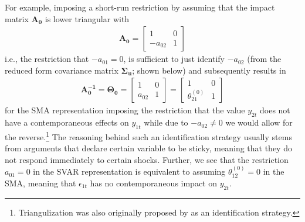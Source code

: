 \documentclass[a4paper,11pt,listof=nochaptergap,oneside,pointednumbers,bibtotoc,bigheadings,liststotoc,hidelinks]{scrbook}
\theoremstyle{mysatz}
\theoremstyle{mydefinition}
\theoremstyle{mytheorem}
\theoremstyle{mybemerkung}
\newcommand{\vect}[1]{\boldsymbol{\mathbf{#1}}}
\begin{document}
For example, imposing a short-run restriction by assuming that the impact matrix $\vect{A_0}$ is lower triangular with
\begin{equation} \label{eq:svar11}
\begin{split}
 		\vect{A_0} = 	\begin{bmatrix}
    					1 & 0 \\
					-a_{02} & 1
 					\end{bmatrix}
\end{split}								
\end{equation}
i.e., the restriction that $-a_{01}=0$, is sufficient to just identify $-a_{02}$ (from the reduced form covariance matrix $\vect{\Sigma_u}$; shown below) and subsequently results in 
\begin{equation} \label{eq:svar12}
\begin{split}
 		\vect{A_0^{-1}} = \vect{\Theta_0} = 	
					\begin{bmatrix}
    					1 & 0 \\
					a_{02} & 1
 					\end{bmatrix} = 
						\begin{bmatrix}
    						1 & 0 \\
						\theta_{21}^{(0)} & 1
 						\end{bmatrix}
\end{split}								
\end{equation}
for the SMA representation imposing the restriction that the value $y_{2t}$ does not have a contemporaneous effects on $y_{1t}$ while due to $-a_{02} \neq 0$ we would allow for the reverse.\footnote{Triangulization was also originally proposed by \citet{sims:80} as an identification strategy.} The reasoning behind such an identification strategy usually stems from arguments that declare certain variable to be sticky, meaning that they do not respond immediately to certain shocks. Further, we see that the restriction $a_{01}=0$ in the SVAR representation is equivalent to assuming $\theta_{12}^{(0)}=0$ in the SMA, meaning that $\epsilon_{1t}$ has no contemporaneous impact on $y_{2t}$.
\end{document}
